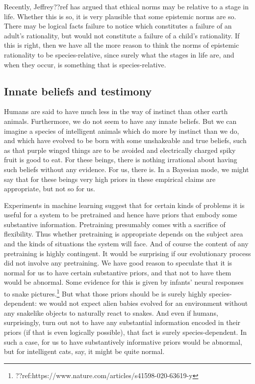 Recently, Jeffrey??ref has argued that ethical norms may be relative to a stage in life. Whether this is so, it is very
plausible that some epistemic norms are so. There may be logical facts failure to notice which constitutes a failure of 
an adult's rationality, but would not constitute a failure of a child's rationality. If this is right, then we have all
the more reason to think the norms of epistemic rationality to be species-relative, since surely what the stages in 
life are, and when they occur, is something that is species-relative.

\subsection{Innate beliefs and testimony}
Humans are said to have much less in the way of instinct than other earth animals. Furthermore, we do not seem to
have any innate beliefs. But we can imagine a species of intelligent animals which do more by instinct than we do,
and which have evolved to be born with some unshakeable and true beliefs, such as that purple winged things are to 
be avoided and electrically charged spiky fruit is good to eat. For these beings, there is nothing irrational about 
having such beliefs without any evidence. For us, there is. In a Bayesian mode, we might say that for these
beings very high priors in these empirical claims are appropriate, but not so for us. 

Experiments in machine learning suggest that for certain kinds of problems it is useful for a system to be pretrained
and hence have priors that embody some substantive information. Pretraining presumably comes with a sacrifice of flexibility.
Thus whether pretraining is appropriate depends on the subject area and the kinds of situations the system will face. And
of course the content of any pretraining is highly contingent. It would be surprising if our evolutionary process did not 
involve any pretraining. We have good reason to speculate that it is normal for us to have certain substantive 
priors, and that not to have them would be abnormal. Some evidence for this is given by infants' neural responses to
snake pictures.\footnote{??ref:https://www.nature.com/articles/s41598-020-63619-y} But what those priors should be is surely highly 
species-dependent: we would not expect alien babies evolved for an environment without any snakelike objects to naturally
react to snakes. And even if humans, surprisingly, turn out not to have any substantial information encoded in their priors (if that is even logically 
possible), that fact is surely species-dependent. In such a case, for us to have substantively informative priors would be
abnormal, but for intelligent cats, say, it might be quite normal. 

